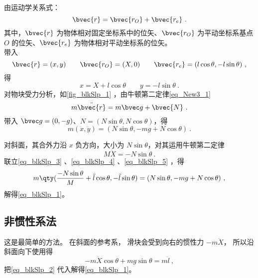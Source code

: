 由运动学关系式：
\begin{equation}
\bvec{r}=\bvec{r_{O}}+\bvec{r_{e}}~.
\end{equation}
其中，$\bvec{r}$ 为物体相对固定坐标系中的位矢、$\bvec{r_{O}}$ 为平动坐标系基点 $O$ 的位矢、$\bvec{r_{e}}$ 为物体相对平动坐标系的位矢。\\
带入
\begin{equation}
\bvec{r}=(x,y)\qquad \bvec{r_O}=(X,0)\qquad \bvec{r_e}=(l\cos\theta,-l\sin\theta)~,
\end{equation}
得
\begin{equation}\label{eq_blkSlp_3}
x=X+l\cos\theta \qquad y=-l\sin\theta~.
\end{equation}
对物块受力分析，如\autoref{fig_blkSlp_1} ，由牛顿第二定律\autoref{eq_New3_1}~
\begin{equation}
m\ddot{\bvec{r}}=m\bvec g+\bvec{N}~.
\end{equation}
带入 $\bvec g=(0,-g)$、$N=(N\sin\theta,N\cos\theta)$，得
\begin{equation}\label{eq_blkSlp_4}
m(\ddot x,\ddot y)=(N\sin\theta,-mg+N\cos\theta)~.
\end{equation}

对斜面，其合外力沿 $x$ 负方向，大小为 $N\sin\theta$，对其运用牛顿第二定律
\begin{equation}\label{eq_blkSlp_5}
M\ddot X=-N\sin \theta~.
\end{equation}
联立\autoref{eq_blkSlp_3} 、\autoref{eq_blkSlp_4} 、\autoref{eq_blkSlp_5} ，得
\begin{equation}
m\qty(\frac{-N\sin\theta}{M}+\ddot l\cos\theta,-\ddot l\sin\theta)=(N\sin\theta,-mg+N\cos\theta)~,
\end{equation}
解得\autoref{eq_blkSlp_1}。

\subsection{非惯性系法}
这是最简单的方法。 在斜面的参考系， 滑块会受到向右的惯性力 $-m\ddot X$， 所以沿斜面向下使用得
\begin{equation}
-m\ddot X\cos\theta + mg\sin\theta = m\ddot l~,
\end{equation}
把\autoref{eq_blkSlp_2} 代入解得\autoref{eq_blkSlp_1}。

